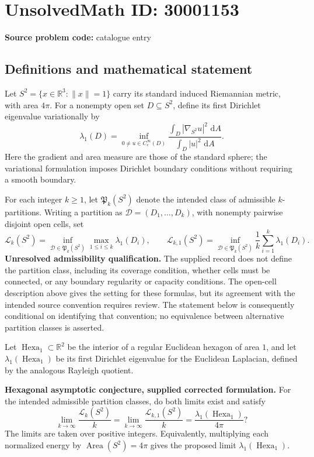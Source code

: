 \documentclass[11pt]{article}
\newcommand{\R}{\mathbb{R}}
\newcommand{\dd}{\,\mathrm{d}}
\begin{document}
\section*{UnsolvedMath ID: 30001153}
\textbf{Source problem code:} catalogue entry
\subsection{Definitions and mathematical statement}
Let \(S^2=\{x\in\R^3:\lVert x\rVert=1\}\) carry its standard induced Riemannian metric, with area \(4\pi\). For a nonempty open set \(D\subseteq S^2\), define its first Dirichlet eigenvalue variationally by
\[
\lambda_1(D)=\inf_{0\ne u\in C_c^\infty(D)}\frac{\int_D |\nabla_{S^2}u|^2\,\dd A}{\int_D |u|^2\,\dd A}.
\]
Here the gradient and area measure are those of the standard sphere; the variational formulation imposes Dirichlet boundary conditions without requiring a smooth boundary.

For each integer \(k\ge1\), let \(\mathfrak P_k(S^2)\) denote the intended class of admissible \(k\)-partitions. Writing a partition as \(\mathcal D=(D_1,\ldots,D_k)\), with nonempty pairwise disjoint open cells, set
\[
\mathcal L_k(S^2)=\inf_{\mathcal D\in\mathfrak P_k(S^2)}\max_{1\le i\le k}\lambda_1(D_i),\qquad
\mathcal L_{k,1}(S^2)=\inf_{\mathcal D\in\mathfrak P_k(S^2)}\frac1k\sum_{i=1}^k\lambda_1(D_i).
\]
\textbf{Unresolved admissibility qualification.} The supplied record does not define the partition class, including its coverage condition, whether cells must be connected, or any boundary regularity or capacity conditions. The open-cell description above gives the setting for these formulas, but its agreement with the intended source convention requires review. The statement below is consequently conditional on identifying that convention; no equivalence between alternative partition classes is asserted.

Let \(\operatorname{Hexa}_1\subset\R^2\) be the interior of a regular Euclidean hexagon of area \(1\), and let \(\lambda_1(\operatorname{Hexa}_1)\) be its first Dirichlet eigenvalue for the Euclidean Laplacian, defined by the analogous Rayleigh quotient.

\textbf{Hexagonal asymptotic conjecture, supplied corrected formulation.} For the intended admissible partition classes, do both limits exist and satisfy
\[
\lim_{k\to\infty}\frac{\mathcal L_k(S^2)}{k}
=\lim_{k\to\infty}\frac{\mathcal L_{k,1}(S^2)}{k}
=\frac{\lambda_1(\operatorname{Hexa}_1)}{4\pi}?
\]
The limits are taken over positive integers. Equivalently, multiplying each normalized energy by \(\operatorname{Area}(S^2)=4\pi\) gives the proposed limit \(\lambda_1(\operatorname{Hexa}_1)\).
\end{document}
